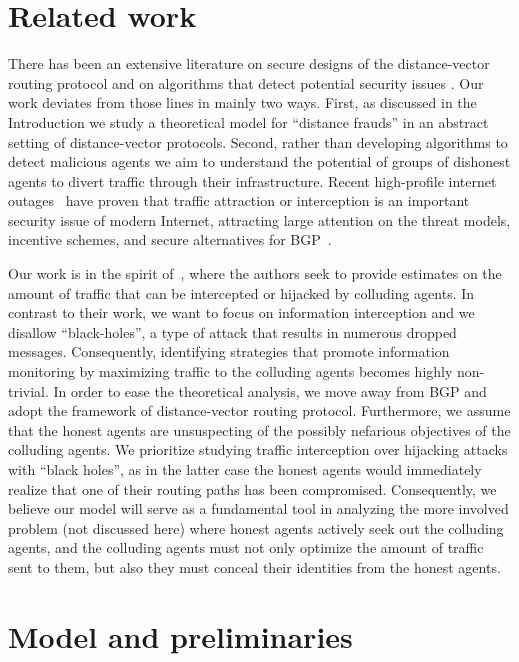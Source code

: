 \documentclass{comnet}
\begin{document}
\section{Related work} \label{sec:related}

There has been an extensive literature on secure designs of the distance-vector
routing protocol \cite{Hu2003175, 579225, Tao, Lopez} and on algorithms that
detect potential security issues \cite{1203939, 1258478, 1367222}. Our work
deviates from those lines in mainly two ways. First, as discussed in the
Introduction we study a theoretical model for ``distance frauds''
\cite{1039858} in an abstract setting of distance-vector protocols. Second,
rather than developing algorithms to detect malicious agents we aim to
understand the potential of groups of dishonest agents to divert traffic
through their infrastructure. Recent high-profile internet
outages~\cite{Stone08} have proven that traffic attraction or interception is
an important security issue of modern Internet, attracting large attention on
the threat models, incentive schemes, and secure alternatives for
BGP~\cite{ButlerFMR10,GoldbergSHR10,BallaniFZ07,NordstromD04,GoldbergHJRW08,LevinSZ08}.

Our work is in the spirit of~\cite{BallaniFZ07}, where the authors seek to
provide estimates on the amount of traffic that can be intercepted or hijacked
by colluding agents.  In contrast to their work, we want to focus on
information interception and we disallow ``black-holes'', a type of attack that
results in numerous dropped messages.  Consequently, identifying strategies
that promote information monitoring by maximizing traffic to the colluding
agents  becomes highly non-trivial.  In order to ease the theoretical analysis,
we move away from BGP and adopt the framework of distance-vector routing
protocol.  Furthermore, we assume that the honest agents are unsuspecting of
the possibly nefarious objectives of the colluding agents.  We prioritize
studying traffic interception over hijacking attacks with ``black holes'', as
in the latter case the honest agents would immediately realize that one of
their routing paths has been compromised.  Consequently, we believe our model
will serve as a fundamental tool in analyzing the more involved problem (not
discussed here) where honest agents actively seek out the colluding agents, and
the colluding agents must not only optimize the amount of traffic sent to them,
but also they must conceal their identities from the honest agents.

\section{Model and preliminaries} \label{sec:models}
\end{document}
